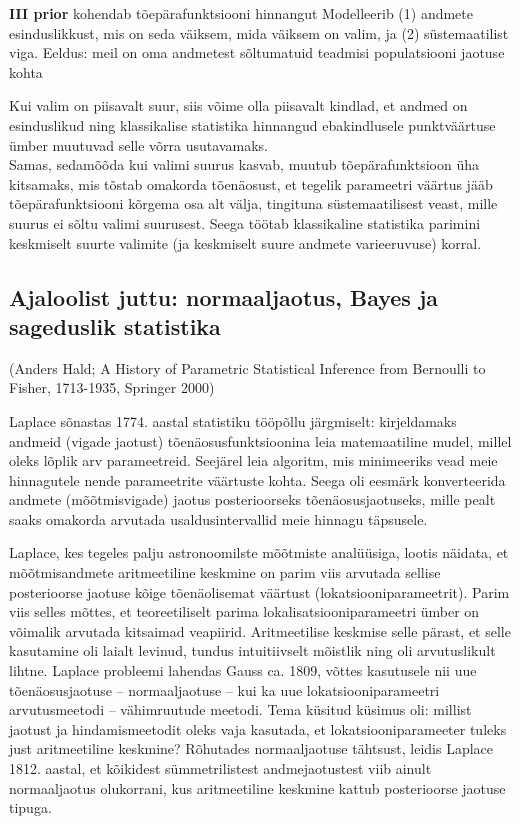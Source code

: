 \documentclass[]{book}
\begin{document}
\textbf{III prior} kohendab tõepärafunktsiooni hinnangut Modelleerib (1)
andmete esinduslikkust, mis on seda väiksem, mida väiksem on valim, ja
(2) süstemaatilist viga. Eeldus: meil on oma andmetest sõltumatuid
teadmisi populatsiooni jaotuse kohta

Kui valim on piisavalt suur, siis võime olla piisavalt kindlad, et
andmed on esinduslikud ning klassikalise statistika hinnangud
ebakindlusele punktväärtuse ümber muutuvad selle võrra usutavamaks.\\
Samas, sedamõõda kui valimi suurus kasvab, muutub tõepärafunktsioon üha
kitsamaks, mis tõstab omakorda tõenäosust, et tegelik parameetri väärtus
jääb tõepärafunktsiooni kõrgema osa alt välja, tingituna
süstemaatilisest veast, mille suurus ei sõltu valimi suurusest. Seega
töötab klassikaline statistika parimini keskmiselt suurte valimite (ja
keskmiselt suure andmete varieeruvuse) korral.

\subsection{Ajaloolist juttu: normaaljaotus, Bayes ja sageduslik
statistika}\label{ajaloolist-juttu-normaaljaotus-bayes-ja-sageduslik-statistika-1}

(Anders Hald; A History of Parametric Statistical Inference from
Bernoulli to Fisher, 1713-1935, Springer 2000)

Laplace sõnastas 1774. aastal statistiku tööpõllu järgmiselt:
kirjeldamaks andmeid (vigade jaotust) tõenäosusfunktsioonina leia
matemaatiline mudel, millel oleks lõplik arv parameetreid. Seejärel leia
algoritm, mis minimeeriks vead meie hinnagutele nende parameetrite
väärtuste kohta. Seega oli eesmärk konverteerida andmete (mõõtmisvigade)
jaotus posterioorseks tõenäosusjaotuseks, mille pealt saaks omakorda
arvutada usaldusintervallid meie hinnagu täpsusele.

Laplace, kes tegeles palju astronoomilste mõõtmiste analüüsiga, lootis
näidata, et mõõtmisandmete aritmeetiline keskmine on parim viis arvutada
sellise posterioorse jaotuse kõige tõenäolisemat väärtust
(lokatsiooniparameetrit). Parim viis selles mõttes, et teoreetiliselt
parima lokalisatsiooniparameetri ümber on võimalik arvutada kitsaimad
veapiirid. Aritmeetilise keskmise selle pärast, et selle kasutamine oli
laialt levinud, tundus intuitiivselt mõistlik ning oli arvutuslikult
lihtne. Laplace probleemi lahendas Gauss ca. 1809, võttes kasutusele nii
uue tõenäosusjaotuse -- normaaljaotuse -- kui ka uue
lokatsiooniparameetri arvutusmeetodi -- vähimruutude meetodi. Tema
küsitud küsimus oli: millist jaotust ja hindamismeetodit oleks vaja
kasutada, et lokatsiooniparameeter tuleks just aritmeetiline keskmine?
Rõhutades normaaljaotuse tähtsust, leidis Laplace 1812. aastal, et
kõikidest sümmetrilistest andmejaotustest viib ainult normaaljaotus
olukorrani, kus aritmeetiline keskmine kattub posterioorse jaotuse
tipuga.
\end{document}
